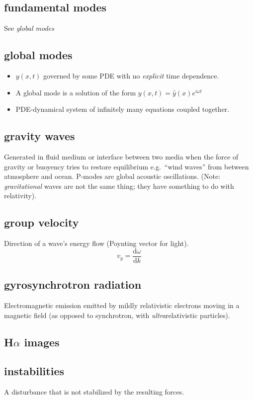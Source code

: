 \documentclass{article}
\begin{document}
\subsection{fundamental modes}
See \emph{global modes}

\subsection{global modes}
\begin{itemize}
    \item $y(x,t)$ governed by some PDE with no \emph{explicit} time dependence.
    \item A global mode is a solution of the form
        $y(x,t) = \hat{y}(x)e^{i\omega t}$
    \item PDE-dynamical system of infinitely many equations coupled together.
\end{itemize}

\subsection{gravity waves}
Generated in fluid medium or interface between two media when the
force of gravity or buoyency tries to restore equilibrium
e.g.\ ``wind waves'' from between atmosphere and ocean.
P-modes are global acoustic oscillations.
(Note: \emph{gravitational} waves are not the same thing; they
have something to do with relativity).

\subsection{group velocity}
Direction of a wave's energy flow (Poynting vector for light).
\[
    v_{g} = \frac{ \mathrm{d}\omega }{ \mathrm{d}k }
    \]

\subsection{gyrosynchrotron radiation}
Electromagnetic emission emitted by mildly relativistic electrons moving
in a magnetic field
(as opposed to synchrotron, with \emph{ultra}relativistic particles).
\subsection{H$\alpha$ images}
\subsection{instabilities}
A disturbance that is not stabilized by the resulting forces.
\end{document}
